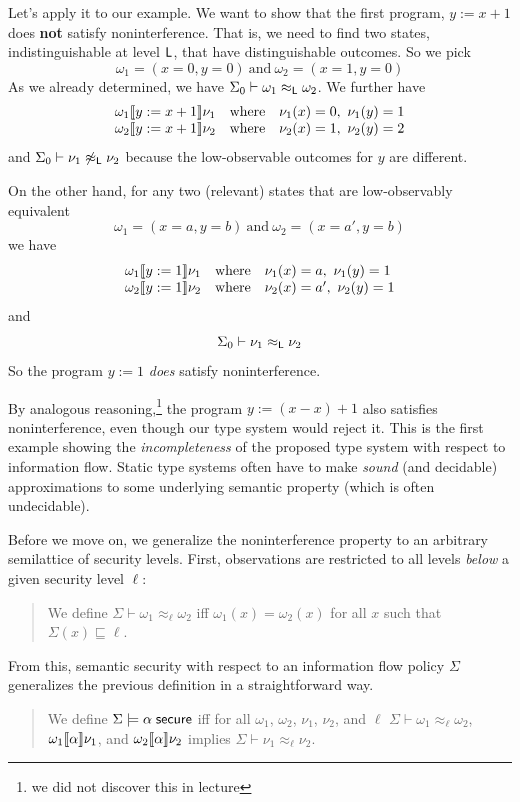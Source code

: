 \documentclass[11pt]{article}
\begin{document}
Let's apply it to our example.  We want to show that the first program,
$y := x + 1$ does \textbf{not} satisfy noninterference.  That is, we need
to find two states, indistinguishable at level $\mathsf{L}$, that have
distinguishable outcomes.  So we pick
\[
  \omega_1 = (x = 0, y = 0)\ \mbox{and}\ \omega_2 = (x = 1, y = 0)
\]
As we already determined, we have $\Sigma_0 \vdash \omega_1 \approx_{\mathsf{L}} \omega_2$.
We further have
\[
  \begin{array}{lcl}
    \omega_1 \llbracket y := x+1 \rrbracket \nu_1
    & \mbox{where} & \nu_1(x) = 0,\ \nu_1(y) = 1 \\
    \omega_2 \llbracket y := x+1 \rrbracket \nu_2
    & \mbox{where} & \nu_2(x) = 1,\ \nu_2(y) = 2
  \end{array}
\]
and $\Sigma_0 \vdash \nu_1 \not\approx_{\mathsf{L}} \nu_2$ because
the low-observable outcomes for $y$ are different.

On the other hand, for any two (relevant) states that are low-observably
equivalent
\[
  \omega_1 = (x = a, y = b)\ \mbox{and}\ \omega_2 = (x = a', y = b)
\]
we have
\[
  \begin{array}{lcl}
    \omega_1 \llbracket y := 1 \rrbracket \nu_1
    & \mbox{where} & \nu_1(x) = a,\ \nu_1(y) = 1 \\
    \omega_2 \llbracket y := 1 \rrbracket \nu_2
    & \mbox{where} & \nu_2(x) = a',\ \nu_2(y) = 1
  \end{array}
\]
and
\[
  \Sigma_0 \vdash \nu_1 \approx_{\mathsf{L}} \nu_2
\]
So the program $y := 1$ \emph{does} satisfy noninterference.

By analogous reasoning,\footnote{we did not discover this in lecture} the
program $y := (x-x) + 1$ also satisfies noninterference, even though our type
system would reject it.  This is the first example showing the
\emph{incompleteness} of the proposed type system with respect to information
flow.  Static type systems often have to make \emph{sound} (and decidable)
approximations to some underlying semantic property (which is often
undecidable).

Before we move on, we generalize the noninterference property to an arbitrary
semilattice of security levels.  First, observations are restricted
to all levels \emph{below} a given security level $\ell$:
\begin{quote}
  We define $\Sigma \vdash \omega_1 \approx_\ell \omega_2$
  iff $\omega_1(x) = \omega_2(x)$ for all $x$ such that $\Sigma(x) \sqsubseteq \ell$.
\end{quote}
From this, semantic security with respect to an information flow policy $\Sigma$
generalizes the previous definition in a straightforward way.
\begin{quote}
  We define $\Sigma \models \alpha\; \mathsf{secure}$
  iff for all $\omega_1$, $\omega_2$, $\nu_1$, $\nu_2$, and $\ell$ \newline
  $\Sigma \vdash \omega_1 \approx_\ell \omega_2$,
  $\omega_1 \llbracket \alpha \rrbracket \nu_1$, and $\omega_2 \llbracket \alpha \rrbracket \nu_2$
  implies $\Sigma \vdash \nu_1 \approx_\ell \nu_2$.
\end{quote}
\end{document}
